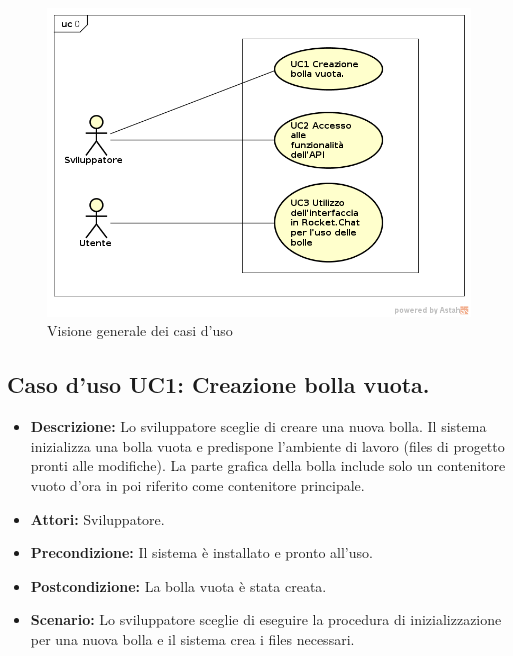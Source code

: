    \FloatBarrier
   \begin{figure}[ht]
   \centering
   \includegraphics[scale=0.45]{img/0.png}
   \caption{Visione generale dei casi d'uso}
\end{figure}
\FloatBarrier
\subsection{Caso d'uso UC1: Creazione bolla vuota.}
\begin{itemize}
\item[]\textbf{Descrizione:} Lo sviluppatore sceglie di creare una nuova bolla. Il sistema inizializza una bolla vuota e predispone l'ambiente di lavoro (files di progetto pronti alle modifiche). La parte grafica della bolla include solo un contenitore vuoto d'ora in poi riferito come contenitore principale.
\item[]\textbf{Attori:} Sviluppatore. 
\item[]\textbf{Precondizione:} Il sistema è installato e pronto all'uso. 
\item[]\textbf{Postcondizione:} La bolla vuota è stata creata. 
\item[]\textbf{Scenario:}
 Lo sviluppatore sceglie di eseguire la procedura di inizializzazione per una nuova bolla e il sistema crea i files necessari.

 
\end{itemize}

\clearpage

